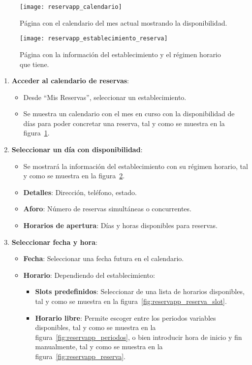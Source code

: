 \begin{figure}[H]
	\centering
	\texttt{[image: reservapp\_calendario]}
	\caption{Página con el calendario del mes actual mostrando la disponibilidad.}
	\label{fig:reservapp_calendario}
\end{figure}

\begin{figure}[H]
	\centering
		\texttt{[image: reservapp\_establecimiento\_reserva]}
	\caption{Página con la información del establecimiento y el régimen horario que tiene.}
	\label{fig:reservapp_establecimiento_reserva}
\end{figure}

\begin{enumerate}
   \item \textbf{Acceder al calendario de reservas}:
   \begin{itemize}
      \item Desde ``Mis Reservas'', seleccionar un establecimiento.
      \item Se muestra un calendario con el mes en curso con la disponibilidad de días para poder concretar una reserva, tal y como se muestra en la figura~\ref{fig:reservapp_calendario}.
   \end{itemize}
   \item \textbf{Seleccionar un día con disponibilidad}:
   \begin{itemize}
      \item Se mostrará la información del establecimiento con su régimen horario, tal y como se muestra en la figura~\ref{fig:reservapp_establecimiento_reserva}.
      \item \textbf{Detalles}: Dirección, teléfono, estado.
      \item \textbf{Aforo}: Número de reservas simultáneas o concurrentes.
      \item \textbf{Horarios de apertura}: Días y horas disponibles para reservas.
   \end{itemize}
   \item \textbf{Seleccionar fecha y hora}:
   \begin{itemize}
      \item \textbf{Fecha}: Seleccionar una fecha futura en el calendario.
      \item \textbf{Horario}: Dependiendo del establecimiento:
      \begin{itemize}
         \item \textbf{Slots predefinidos}: Seleccionar de una lista de horarios disponibles, tal y como se muestra en la figura~\ref{fig:reservapp_reserva_slot}.
         \item \textbf{Horario libre}: Permite escoger entre los periodos variables disponibles, tal y como se muestra en la figura~\ref{fig:reservapp_periodos}, o bien introducir hora de inicio y fin manualmente, tal y como se muestra en la figura~\ref{fig:reservapp_reserva}.
      \end{itemize}
   \end{itemize}


\end{enumerate}
